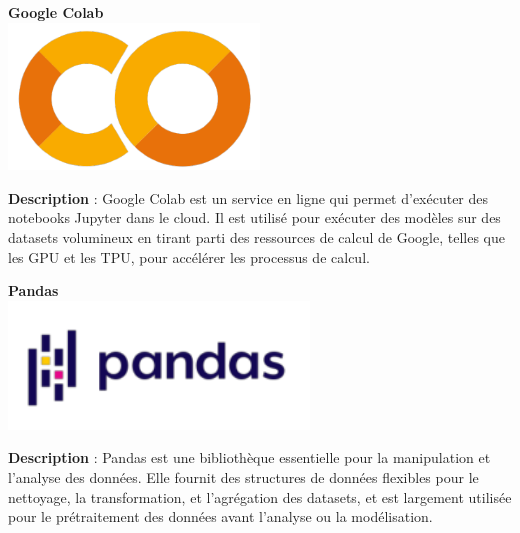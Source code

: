 \begin{minipage}[t]{0.46\textwidth}
	\begin{center}
		\textbf{Google Colab} \\
		\includegraphics[width=0.5\textwidth]{images/logoColabs}\\ %
	\end{center}
	\textbf{Description} : Google Colab est un service en ligne qui permet d'exécuter des notebooks Jupyter dans le cloud. Il est utilisé pour exécuter des modèles sur des datasets volumineux en tirant parti des ressources de calcul de Google, telles que les GPU et les TPU, pour accélérer les processus de calcul.
\end{minipage}
\hfill
\begin{minipage}[t]{0.46\textwidth}
	\begin{center}
		\textbf{Pandas} \\
		\includegraphics[width=0.6\textwidth]{images/logoPandas} %
	\end{center}
    \textbf{Description} : Pandas est une bibliothèque essentielle pour la manipulation et l'analyse des données. Elle fournit des structures de données flexibles pour le nettoyage, la transformation, et l'agrégation des datasets, et est largement utilisée pour le prétraitement des données avant l'analyse ou la modélisation.
\end{minipage}

